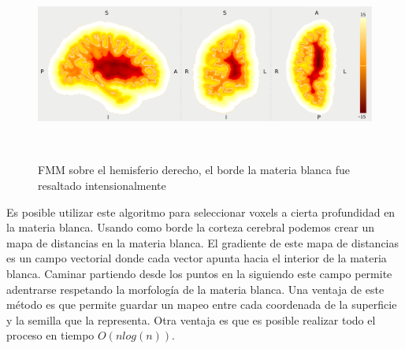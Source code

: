\begin{figure}[h!]

\centering
\begin{minipage}[b]{0.7\textwidth}
    \includegraphics[width=\textwidth]{img/fmm.png}
    \caption{\small FMM sobre el hemisferio derecho, el borde la materia blanca fue
    resaltado intensionalmente}
    \label{fig:fmm}
\end{minipage} ~

\end{figure}  

Es posible utilizar este algoritmo para seleccionar voxels a cierta profundidad
en la materia blanca. Usando como borde la corteza cerebral podemos crear un mapa
de distancias en la materia blanca. El gradiente de este mapa de distancias es un
campo vectorial donde cada vector apunta hacia el interior de la materia blanca.
Caminar partiendo desde los puntos en la siguiendo este campo permite adentrarse 
respetando la morfolog\'ia de la materia blanca. Una ventaja de este m\'etodo es
que permite guardar un mapeo entre cada coordenada de la superficie y la semilla
que la representa. Otra ventaja es que es posible realizar todo el proceso en tiempo
$O(n log(n))$. \\
